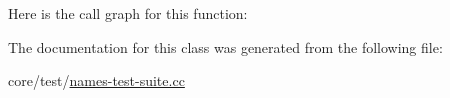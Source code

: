 Here is the call graph for this function\+:




The documentation for this class was generated from the following file\+:\begin{DoxyCompactItemize}
\item 
core/test/\hyperlink{names-test-suite_8cc}{names-\/test-\/suite.\+cc}\end{DoxyCompactItemize}
